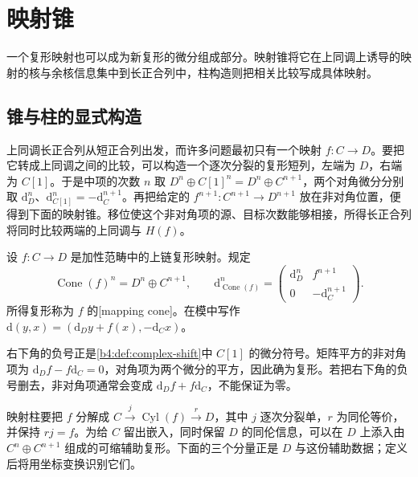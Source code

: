 
\section{映射锥}
\label{b4:sec:0602}

一个复形映射也可以成为新复形的微分组成部分。映射锥将它在上同调上诱导的映射的核与余核信息集中到长正合列中，柱构造则把相关比较写成具体映射。

%
%

\subsection{锥与柱的显式构造}
\label{b4:subsec:0602:01}

上同调长正合列从短正合列出发，而许多问题最初只有一个映射 \(f:C\to D\)。要把它转成上同调之间的比较，可以构造一个逐次分裂的复形短列，左端为 \(D\)，右端为 \(C[1]\)。于是中项的次数 \(n\) 取 \(D^n\oplus C[1]^n=D^n\oplus C^{n+1}\)，两个对角微分分别取 \(\mathrm{d}_D^n\)、\(\mathrm{d}_{C[1]}^n=-\mathrm{d}_C^{n+1}\)。再把给定的 \(f^{n+1}:C^{n+1}\to D^{n+1}\) 放在非对角位置，便得到下面的映射锥。移位使这个非对角项的源、目标次数能够相接，所得长正合列将同时比较两端的上同调与 \(H(f)\)。

\begin{definition}\label{b4:def:mapping-cone}
	设 \(f:C\to D\) 是加性范畴中的上链复形映射。规定
	\[
		\operatorname{Cone}(f)^n=D^n\oplus C^{n+1},\qquad \mathrm{d}_{\operatorname{Cone}(f)}^n=
		\begin{pmatrix}\mathrm{d}_D^n&f^{n+1}\\0&-\mathrm{d}_C^{n+1}\end{pmatrix}.
	\]
	所得复形称为 \(f\) 的[mapping cone]。在模中写作 \(\mathrm{d}(y,x)=(\mathrm{d}_Dy+f(x),-\mathrm{d}_Cx)\)。
\end{definition}

右下角的负号正是\cref{b4:def:complex-shift}中 \(C[1]\) 的微分符号。矩阵平方的非对角项为 \(\mathrm{d}_Df-f\mathrm{d}_C=0\)，对角项为两个微分的平方，因此确为复形。若把右下角的负号删去，非对角项通常会变成 \(\mathrm{d}_Df+f\mathrm{d}_C\)，不能保证为零。

映射柱要把 \(f\) 分解成 \(C\xrightarrow{j}\operatorname{Cyl}(f)\xrightarrow{r}D\)，其中 \(j\) 逐次分裂单，\(r\) 为同伦等价，并保持 \(rj=f\)。为给 \(C\) 留出嵌入，同时保留 \(D\) 的同伦信息，可以在 \(D\) 上添入由 \(C^n\oplus C^{n+1}\) 组成的可缩辅助复形。下面的三个分量正是 \(D\) 与这份辅助数据；定义后将用坐标变换识别它们。

